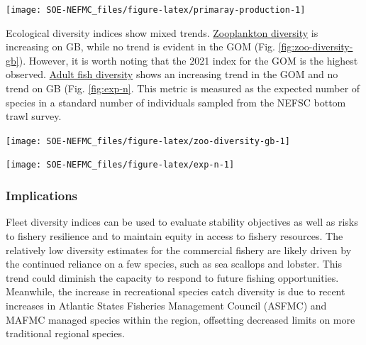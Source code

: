 \documentclass[
  10pt,
]{article}
\let\origfigure\figure
\let\endorigfigure\endfigure
\renewenvironment{figure}[1][2] {
    \expandafter\origfigure\expandafter[H]
} {
    \endorigfigure
}
\begin{document}
\begin{figure}

{\centering \texttt{[image: SOE-NEFMC\_files/figure-latex/primaray-production-1]} 

}

\caption{Total areal annual primary production by ecological production unit. The dashed line represents the long-term (1998-2023) annual mean.}\label{fig:primaray-production}
\end{figure}

Ecological diversity indices show mixed trends. \href{https://noaa-edab.github.io/catalog/zooplankton-diversity.html}{Zooplankton diversity} is increasing on GB, while no trend is evident in the GOM (Fig. \ref{fig:zoo-diversity-gb}). However, it is worth noting that the 2021 index for the GOM is the highest observed. \href{https://noaa-edab.github.io/catalog/expected-number-of-species.html}{Adult fish diversity} shows an increasing trend in the GOM and no trend on GB (Fig. \ref{fig:exp-n}. This metric is measured as the expected number of species in a standard number of individuals sampled from the NEFSC bottom trawl survey.

\begin{figure}

{\centering \texttt{[image: SOE-NEFMC\_files/figure-latex/zoo-diversity-gb-1]} 

}

\caption{Zooplankton diversity on Georges Bank and in the Gulf of Maine, based on Shannon diversity index. 2020 surveys were incomplete due to COVID-19.}\label{fig:zoo-diversity-gb}
\end{figure}
\begin{figure}

{\centering \texttt{[image: SOE-NEFMC\_files/figure-latex/exp-n-1]} 

}

\caption{Adult fish diversity for Georges Bank and in the Gulf of Maine, based on expected number of species. Results from survey vessels Albatross and Bigelow are reported separately due to catchability differences.}\label{fig:exp-n}
\end{figure}

\hypertarget{implications-3}{%
\subsubsection{Implications}\label{implications-3}}

Fleet diversity indices can be used to evaluate stability objectives as well as risks to fishery resilience and to maintain equity in access to fishery resources. The relatively low diversity estimates for the commercial fishery are likely driven by the continued reliance on a few species, such as sea scallops and lobster. This trend could diminish the capacity to respond to future fishing opportunities. Meanwhile, the increase in recreational species catch diversity is due to recent increases in Atlantic States Fisheries Management Council (ASFMC) and MAFMC managed species within the region, offsetting decreased limits on more traditional regional species.
\end{document}
